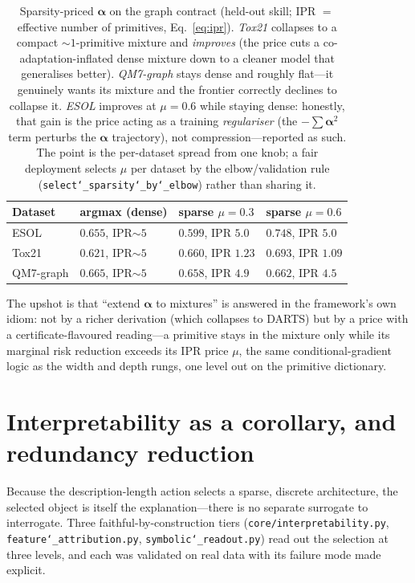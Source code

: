\documentclass[11pt]{article}
\newcommand{\allowbreakhere}{\discretionary{}{}{}}
\newcommand{\code}[1]{\texttt{\def\_{\char`_\allowbreakhere}#1}}
\newcommand{\alphapar}{\bm{\alpha}}
\begin{document}
\begin{table}[h]
\centering
\small
\renewcommand{\arraystretch}{1.2}
\begin{tabular}{p{2.6cm} p{2.8cm} p{3.0cm} p{3.0cm}}
\toprule
\textbf{Dataset} & \textbf{argmax (dense)} & \textbf{sparse $\mu{=}0.3$} & \textbf{sparse $\mu{=}0.6$}\\
\midrule
ESOL      & $0.655$, IPR${\sim}5$ & $0.599$, IPR $5.0$ & $\mathbf{0.748}$, IPR $5.0$\\
Tox21     & $0.621$, IPR${\sim}5$ & $0.660$, IPR $1.23$ & $\mathbf{0.693}$, IPR $\mathbf{1.09}$\\
QM7-graph & $0.665$, IPR${\sim}5$ & $0.658$, IPR $4.9$ & $0.662$, IPR $4.5$\\
\bottomrule
\end{tabular}
\caption{Sparsity-priced $\alphapar$ on the graph contract (held-out skill; IPR $=$ effective number of
primitives, Eq.~\ref{eq:ipr}). \emph{Tox21} collapses to a compact ${\sim}1$-primitive mixture and
\emph{improves} (the price cuts a co-adaptation-inflated dense mixture down to a cleaner model that
generalises better). \emph{QM7-graph} stays dense and roughly flat---it genuinely wants its mixture and
the frontier correctly declines to collapse it. \emph{ESOL} improves at $\mu{=}0.6$ while staying dense:
honestly, that gain is the price acting as a training \emph{regulariser} (the $-\sum\alphapar^2$ term
perturbs the $\alphapar$ trajectory), not compression---reported as such. The point is the per-dataset
spread from one knob; a fair deployment selects $\mu$ per dataset by the elbow/validation rule
(\code{select\_sparsity\_by\_elbow}) rather than sharing it.}
\label{tab:sparsity}
\end{table}

The upshot is that ``extend $\alphapar$ to mixtures'' is answered in the framework's own idiom: not by a
richer derivation (which collapses to DARTS) but by a price with a certificate-flavoured reading---a
primitive stays in the mixture only while its marginal risk reduction exceeds its IPR price $\mu$, the
same conditional-gradient logic as the width and depth rungs, one level out on the primitive dictionary.


\section{Interpretability as a corollary, and redundancy reduction}
\label{sec:interp}

Because the description-length action selects a sparse, discrete architecture, the selected object is itself
the explanation---there is no separate surrogate to interrogate. Three faithful-by-construction tiers
(\code{core/interpretability.py}, \code{feature\_attribution.py}, \code{symbolic\_readout.py}) read out the
selection at three levels, and each was validated on real data with its failure mode made explicit.
\end{document}
